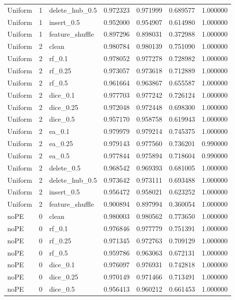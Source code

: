 \documentclass[UTF8,a4paper,11pt,fontset=fandol]{ctexart}
\begin{document}
{\begin{longtable}{lrlrrrr}
Uniform & 1 & delete\_hub\_0.5 & 0.972323 & 0.971999 & 0.689577 & 1.000000 \\
Uniform & 1 & insert\_0.5 & 0.952000 & 0.954907 & 0.614980 & 1.000000 \\
Uniform & 1 & feature\_shuffle & 0.897296 & 0.898031 & 0.372988 & 1.000000 \\
Uniform & 2 & clean & 0.980784 & 0.980139 & 0.751090 & 1.000000 \\
Uniform & 2 & rf\_0.1 & 0.978052 & 0.977278 & 0.728982 & 1.000000 \\
Uniform & 2 & rf\_0.25 & 0.973057 & 0.973618 & 0.712889 & 1.000000 \\
Uniform & 2 & rf\_0.5 & 0.961664 & 0.963867 & 0.655587 & 1.000000 \\
Uniform & 2 & dice\_0.1 & 0.977703 & 0.977242 & 0.726124 & 1.000000 \\
Uniform & 2 & dice\_0.25 & 0.972048 & 0.972448 & 0.698300 & 1.000000 \\
Uniform & 2 & dice\_0.5 & 0.957170 & 0.958758 & 0.619943 & 1.000000 \\
Uniform & 2 & ea\_0.1 & 0.979979 & 0.979214 & 0.745375 & 1.000000 \\
Uniform & 2 & ea\_0.25 & 0.979143 & 0.977560 & 0.736201 & 0.990000 \\
Uniform & 2 & ea\_0.5 & 0.977844 & 0.975894 & 0.718604 & 0.990000 \\
Uniform & 2 & delete\_0.5 & 0.968542 & 0.969393 & 0.681005 & 1.000000 \\
Uniform & 2 & delete\_hub\_0.5 & 0.973642 & 0.973111 & 0.693488 & 1.000000 \\
Uniform & 2 & insert\_0.5 & 0.956472 & 0.958021 & 0.623252 & 1.000000 \\
Uniform & 2 & feature\_shuffle & 0.900894 & 0.897994 & 0.360054 & 1.000000 \\
noPE & 0 & clean & 0.980003 & 0.980562 & 0.773650 & 1.000000 \\
noPE & 0 & rf\_0.1 & 0.976846 & 0.977779 & 0.751391 & 1.000000 \\
noPE & 0 & rf\_0.25 & 0.971345 & 0.972763 & 0.709129 & 1.000000 \\
noPE & 0 & rf\_0.5 & 0.959786 & 0.963063 & 0.672131 & 1.000000 \\
noPE & 0 & dice\_0.1 & 0.976097 & 0.976931 & 0.742818 & 1.000000 \\
noPE & 0 & dice\_0.25 & 0.970149 & 0.971466 & 0.713491 & 1.000000 \\
noPE & 0 & dice\_0.5 & 0.956413 & 0.960212 & 0.661453 & 1.000000 \\

\end{longtable}}
\end{document}

